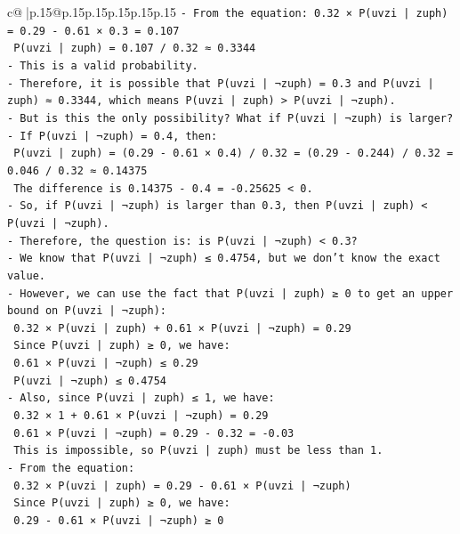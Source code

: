 \documentclass{article}
\begin{document}
{\begin{supertabular}{c@{$\;$}|p{.15\linewidth}@{}p{.15\linewidth}p{.15\linewidth}p{.15\linewidth}p{.15\linewidth}p{.15\linewidth}}
{{{\texttt{{-} From the equation: 0.32 × P(uvzi | zuph) = 0.29 {-} 0.61 × 0.3 = 0.107} \\
\texttt{  P(uvzi | zuph) = 0.107 / 0.32 ≈ 0.3344} \\
\texttt{{-} This is a valid probability.} \\
\texttt{{-} Therefore, it is possible that P(uvzi | ¬zuph) = 0.3 and P(uvzi | zuph) ≈ 0.3344, which means P(uvzi | zuph) > P(uvzi | ¬zuph).} \\
\texttt{{-} But is this the only possibility? What if P(uvzi | ¬zuph) is larger?} \\
\texttt{{-} If P(uvzi | ¬zuph) = 0.4, then:} \\
\texttt{  P(uvzi | zuph) = (0.29 {-} 0.61 × 0.4) / 0.32 = (0.29 {-} 0.244) / 0.32 = 0.046 / 0.32 ≈ 0.14375} \\
\texttt{  The difference is 0.14375 {-} 0.4 = {-}0.25625 < 0.} \\
\texttt{{-} So, if P(uvzi | ¬zuph) is larger than 0.3, then P(uvzi | zuph) < P(uvzi | ¬zuph).} \\
\texttt{{-} Therefore, the question is: is P(uvzi | ¬zuph) < 0.3?} \\
\texttt{{-} We know that P(uvzi | ¬zuph) ≤ 0.4754, but we don't know the exact value.} \\
\texttt{{-} However, we can use the fact that P(uvzi | zuph) ≥ 0 to get an upper bound on P(uvzi | ¬zuph):} \\
\texttt{  0.32 × P(uvzi | zuph) + 0.61 × P(uvzi | ¬zuph) = 0.29} \\
\texttt{  Since P(uvzi | zuph) ≥ 0, we have:} \\
\texttt{  0.61 × P(uvzi | ¬zuph) ≤ 0.29} \\
\texttt{  P(uvzi | ¬zuph) ≤ 0.4754} \\
\texttt{{-} Also, since P(uvzi | zuph) ≤ 1, we have:} \\
\texttt{  0.32 × 1 + 0.61 × P(uvzi | ¬zuph) = 0.29} \\
\texttt{  0.61 × P(uvzi | ¬zuph) = 0.29 {-} 0.32 = {-}0.03} \\
\texttt{  This is impossible, so P(uvzi | zuph) must be less than 1.} \\
\texttt{{-} From the equation:} \\
\texttt{  0.32 × P(uvzi | zuph) = 0.29 {-} 0.61 × P(uvzi | ¬zuph)} \\
\texttt{  Since P(uvzi | zuph) ≥ 0, we have:} \\
\texttt{  0.29 {-} 0.61 × P(uvzi | ¬zuph) ≥ 0} \\
}}}
\end{supertabular}}
\end{document}
